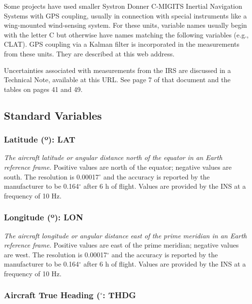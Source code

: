 \documentclass[
]{book}
\begin{document}
Some projects have used smaller Systron Donner C-MIGITS Inertial Navigation Systems with GPS coupling, usually in connection with special instruments like a wing-mounted wind-sensing system. For these units, variable names usually begin with the letter C but otherwise have names matching the following variables (e.g., CLAT). GPS coupling via a Kalman filter is incorporated in the measurements from these units. They are described at this web address.

Uncertainties associated with measurements from the IRS are discussed in a Technical Note, available at this URL. See page 7 of that document and the tables on pages 41 and 49.

\hypertarget{standard-variables}{%
\subsection{Standard Variables}\label{standard-variables}}

\hypertarget{latitude}{%
\subsubsection*{\texorpdfstring{Latitude ({º}): LAT}{Latitude (º): LAT}}\label{latitude}}

\emph{The aircraft latitude or angular distance north of the equator in an Earth reference frame.} Positive values are north of the equator; negative values are south. The resolution is 0.00017\(^{\circ}\)
and the accuracy is reported by the manufacturer to be 0.164\(^{\circ}\)
after 6 h of flight. Values are provided by the INS at a frequency of 10 Hz.

\hypertarget{longitude}{%
\subsubsection*{\texorpdfstring{Longitude ({º}): LON}{Longitude (º): LON}}\label{longitude}}

\emph{The aircraft longitude or angular distance east of the prime meridian in an Earth reference frame.} Positive values are east of the prime meridian; negative values are west. The resolution is 0.00017\(^{\circ}\)
and the accuracy is reported by the manufacturer to be 0.164\(^{\circ}\)
after 6 h of flight. Values are provided by the INS at a frequency of 10 Hz.

\hypertarget{thdg}{%
\subsubsection*{\texorpdfstring{Aircraft True Heading (\(^{\circ}\): THDG}{Aircraft True Heading (\^{}\{\textbackslash circ\}: THDG}}\label{thdg}}
\end{document}
